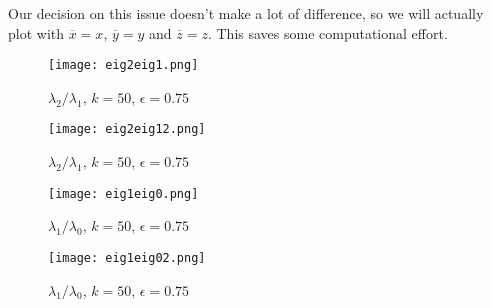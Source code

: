 \documentclass[a4paper,11pt,twoside]{article}
\theoremstyle{definition}
\theoremstyle{remark}
\begin{document}
Our decision on this issue doesn't make a lot of difference, so we will actually plot with $\overline x=x$, $\overline{y}=y$ and $\overline{z}=z$. This saves some computational effort.
\newpage
\begin{figure}[!h]
  \caption{$\lambda_2/\lambda_1$, $k=50$, $\epsilon = 0.75$}
  \centering
    \texttt{[image: eig2eig1.png]}
    \label{eig2eig1}
\end{figure}
\begin{figure}[!h]
  \caption{$\lambda_2/\lambda_1$, $k=50$, $\epsilon = 0.75$}
  \centering
    \texttt{[image: eig2eig12.png]}
    \label{eig2eig12}
\end{figure}
\newpage
\begin{figure}[!h]
  \caption{$\lambda_1/\lambda_0$, $k=50$, $\epsilon = 0.75$}
  \centering
    \texttt{[image: eig1eig0.png]}
    \label{eig1eig0}
\end{figure}
\begin{figure}[!h]
  \caption{$\lambda_1/\lambda_0$, $k=50$, $\epsilon = 0.75$}
  \centering
    \texttt{[image: eig1eig02.png]}
    \label{eig1eig02}
\end{figure}
\newpage
\end{document}
